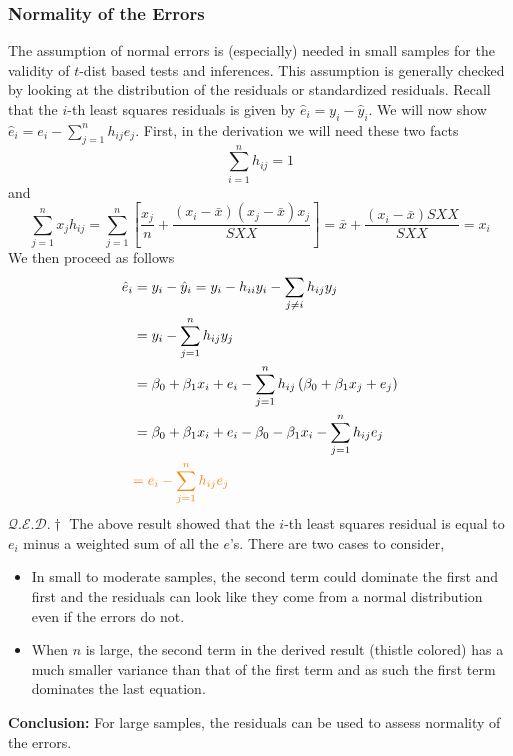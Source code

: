 \documentclass[11pt]{article}
\newcommand{\qed}{\hfill $\mathcal{Q}.\mathcal{E}.\mathcal{D}.\dagger$}
\begin{document}
\subsubsection{Normality of the Errors}
The assumption of normal errors is (especially) needed in small samples for the validity of $t$-dist based tests and inferences. This assumption is generally checked by looking at the distribution of the residuals or standardized residuals. Recall that the $i$-th least squares residuals is given by $\hat{e}_{i}=y_{i}-\hat{y}_{i}$. We will now show $\hat{e}_{i}=e_{i}-\sum_{j=1}^{n} h_{i j} e_{j}$. First, in the derivation we will need these two facts
\begin{equation*}
    \sum_{i=1}^{n} h_{i j}=1
\end{equation*}
and 
\begin{equation*}
    \sum_{j=1}^{n} x_{j} h_{i j}=\sum_{j=1}^{n}\left[\frac{x_{j}}{n}+\frac{\left(x_{i}-\bar{x}\right)\left(x_{j}-\bar{x}\right) x_{j}}{S X X}\right]=\bar{x}+\frac{\left(x_{i}-\bar{x}\right) S X X}{S X X}=x_{i}
\end{equation*}
We then proceed as follows
\begin{align*} 
    \hat{e}_{i} &=y_{i}-\hat{y}_{i} =y_{i}-h_{i i} y_{i}-\sum_{j \neq i} h_{i j} y_{j} \\ 
    &=y_{i}-\sum_{j=1}^{n} h_{i j} y_{j} \\ 
    &=\beta_{0}+\beta_{1} x_{i}+e_{i}-\sum_{j=1}^{n} h_{i j}\left(\beta_{0}+\beta_{1} x_{j}+e_{j}\right) \\ 
    &=\beta_{0}+\beta_{1} x_{i}+e_{i}-\beta_{0}-\beta_{1} x_{i}-\sum_{j=1}^{n} h_{i j} e_{j} \\ 
    &\color{BurntOrange}{=e_{i}-\sum_{j=1}^{n} h_{i j} e_{j}}
\end{align*}
\hfill \qed \newline
The above result showed that the $i$-th least squares residual is equal to $e_i$ minus a weighted sum of all the $e$'s. There are two cases to consider,
\begin{itemize}
    \item In small to moderate samples, the second term could dominate the first and first and the residuals can look like they come from a normal distribution even if the errors do not. 
    \item When $n$ is large, the second term in the derived result (thistle colored) has a much smaller variance than that of the first term and as such the first term dominates the last equation. 
\end{itemize}
\textbf{Conclusion:} For large samples, the residuals can be used to assess normality of the errors.
\end{document}
